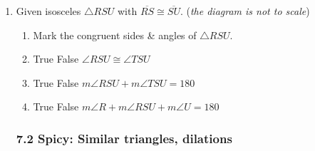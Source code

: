\documentclass[12pt, twoside]{article}
\begin{document}
\begin{enumerate}
    \item Given isosceles $\triangle RSU$ with $\overline{RS} \cong \overline{SU}$. \hfill (\emph{the diagram is not to scale})
      \begin{enumerate}
      \item Mark the congruent sides \& angles of $\triangle RSU$. %
        \item True \quad False \quad $\angle RSU \cong \angle TSU$
        \item True \quad False \quad $m\angle RSU + m\angle TSU =180$  
        \item True \quad False \quad $m\angle R + m\angle RSU + m\angle U =180$   
    \end{enumerate}

\newpage
\subsubsection*{7.2 Spicy: Similar triangles, dilations}


\end{enumerate}
\end{document}
